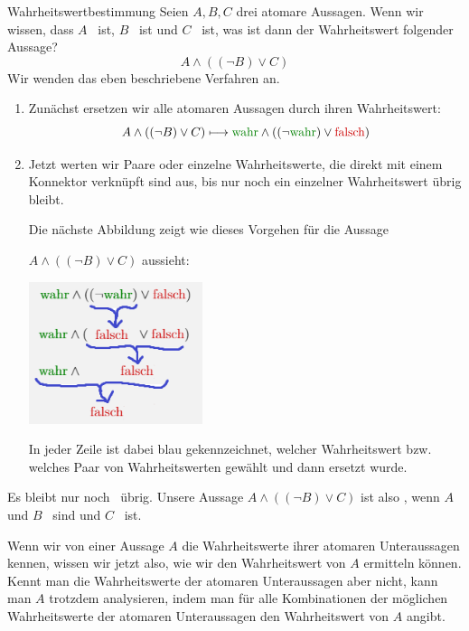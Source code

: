 \documentclass[../../main.tex]{subfiles}
\begin{document}
\begin{example}{Wahrheitswertbestimmung}
Seien $A, B, C$ drei atomare Aussagen. Wenn wir wissen, dass $A$ \wahr\  ist, $B$ \wahr\  ist und $C$ \falsch\   ist, was ist dann der Wahrheitswert folgender Aussage?
\[A \land ( (\lnot B) \lor C)\]
Wir wenden das eben beschriebene Verfahren an.
\begin{enumerate}
    \item Zunächst ersetzen wir alle atomaren Aussagen durch ihren Wahrheitswert:
    \[A \land ( (\lnot B) \lor C) \longmapsto  \wahr \land ((\lnot \wahr) \lor \falsch)\]
    \item Jetzt werten wir Paare oder einzelne Wahrheitswerte, 
    die direkt mit einem Konnektor verknüpft sind aus, bis nur noch ein einzelner Wahrheitswert
    übrig bleibt.
    
    Die nächste Abbildung zeigt wie dieses Vorgehen für die 
    Aussage 
    
    $A \land ( (\lnot B) \lor C)$ aussieht:

\begin{center}
\includegraphics[width=0.4\textwidth]{images/TEMP_wahrheitsalg.png}
\end{center}

In jeder Zeile ist 
    dabei blau gekennzeichnet, welcher Wahrheitswert bzw. welches Paar von 
    Wahrheitswerten gewählt und dann ersetzt wurde. 
\end{enumerate}
Es bleibt nur noch \falsch\  übrig. Unsere Aussage $A \land ( (\lnot B) \lor C)$ ist also
\falsch, wenn $A$ und $B$ \wahr\ sind und $C$ \falsch\ ist.
\end{example}
Wenn wir von einer Aussage $A$ die Wahrheitswerte ihrer atomaren Unteraussagen
kennen, wissen wir jetzt also, wie wir den Wahrheitswert von $A$ ermitteln können. 
Kennt man die Wahrheitswerte der atomaren Unteraussagen aber nicht, kann man $A$ 
trotzdem analysieren, indem man für alle Kombinationen der möglichen Wahrheitswerte 
der atomaren Unteraussagen den Wahrheitswert von $A$ angibt.
\end{document}
